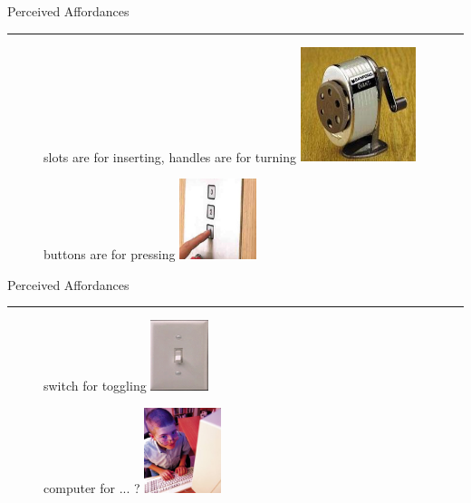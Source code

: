 \documentclass[pdf]{beamer}
\begin{document}
\begin{frame}
{Perceived Affordances}{\textcolor{red}{\rule{12cm}{1.2pt}}}

\begin{figure}
\centering

slots are for inserting, handles are for turning
\newline
\includegraphics[width=0.3\textwidth]{2_slots.jpg}

buttons are for pressing
\newline
\includegraphics[width=0.2\textwidth]{2_buttons.jpg}

\end{figure}
\end{frame}



\begin{frame}
{Perceived Affordances}{\textcolor{red}{\rule{12cm}{1.2pt}}}

\begin{figure}
\centering

switch for toggling
\newline
\includegraphics[width=0.15\textwidth]{2_switch.png}

computer for ... ?
\newline
\includegraphics[width=0.2\textwidth]{2_computer.jpg}

\end{figure}
\end{frame}
\end{document}
